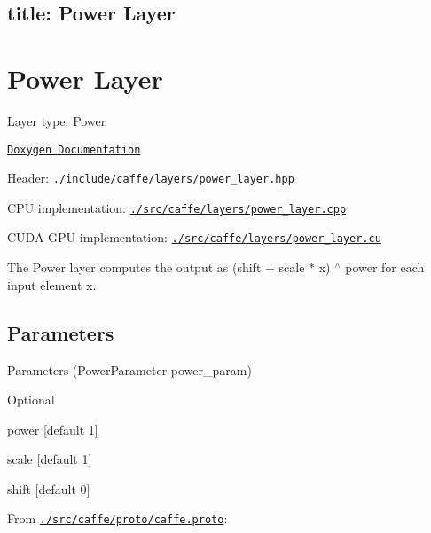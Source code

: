

 \subsection*{title\+: Power Layer }

\section*{Power Layer}


\begin{DoxyItemize}
\item Layer type\+: {\ttfamily Power}
\item \href{http://caffe.berkeleyvision.org/doxygen/classcaffe_1_1PowerLayer.html}{\tt Doxygen Documentation}
\item Header\+: \href{https://github.com/BVLC/caffe/blob/master/include/caffe/layers/power_layer.hpp}{\tt {\ttfamily ./include/caffe/layers/power\+\_\+layer.hpp}}
\item C\+PU implementation\+: \href{https://github.com/BVLC/caffe/blob/master/src/caffe/layers/power_layer.cpp}{\tt {\ttfamily ./src/caffe/layers/power\+\_\+layer.cpp}}
\item C\+U\+DA G\+PU implementation\+: \href{https://github.com/BVLC/caffe/blob/master/src/caffe/layers/power_layer.cu}{\tt {\ttfamily ./src/caffe/layers/power\+\_\+layer.cu}}
\end{DoxyItemize}

The {\ttfamily Power} layer computes the output as (shift + scale $\ast$ x) $^\wedge$ power for each input element x.

\subsection*{Parameters}


\begin{DoxyItemize}
\item Parameters ({\ttfamily Power\+Parameter power\+\_\+param})
\begin{DoxyItemize}
\item Optional
\begin{DoxyItemize}
\item {\ttfamily power} \mbox{[}default 1\mbox{]}
\item {\ttfamily scale} \mbox{[}default 1\mbox{]}
\item {\ttfamily shift} \mbox{[}default 0\mbox{]}
\end{DoxyItemize}
\end{DoxyItemize}
\item From \href{https://github.com/BVLC/caffe/blob/master/src/caffe/proto/caffe.proto}{\tt {\ttfamily ./src/caffe/proto/caffe.proto}}\+:
\end{DoxyItemize}

